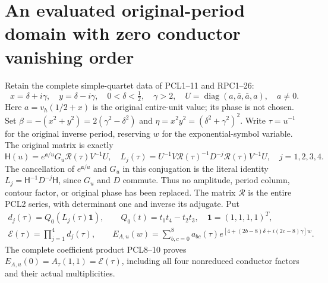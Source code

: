 \section{An evaluated original-period domain with zero conductor vanishing order}
\label{sec:period-zero-value}
Retain the complete simple-quartet data of PCL1--11 and RPC1--26:
\[
 x=\delta+i\gamma,\quad y=\delta-i\gamma,\quad
 0<\delta<\tfrac12,\quad\gamma>2,\quad
 U=\operatorname{diag}(a,\bar a,\bar a,a),\quad a\ne0.
 \tag{PZ1}
\]
Here $a=v_h(1/2+x)$ is the original entire-unit value; its phase is
not chosen. Set $\beta=-(x^2+y^2)=2(\gamma^2-\delta^2)$ and
$\eta=x^2y^2=(\delta^2+\gamma^2)^2$. Write $\tau=u^{-1}$ for the
original inverse period, reserving $w$ for the exponential-symbol variable.
The original matrix is exactly
\[
 \mathsf H(u)=e^{\mathfrak a/u}G_u\mathcal R(\tau)V^{-1}U,
 \quad L_j(\tau)=U^{-1}V\mathcal R(\tau)^{-1}D^{-j}
                         \mathcal R(\tau)V^{-1}U,
 \quad j=1,2,3,4.
 \tag{PZ2}
\]
The cancellation of $e^{\mathfrak a/u}$ and $G_u$ in this conjugation
is the literal identity $L_j=\mathsf H^{-1}D^{-j}\mathsf H$, since
$G_u$ and $D$ commute. Thus no amplitude, period column, contour factor,
or original phase has been replaced. The matrix $\mathcal R$ is the
entire PCL2 series, with determinant one and inverse its adjugate.
Put
\[
 \begin{gathered}
 d_j(\tau)=Q_0(L_j(\tau)\boldsymbol1),\qquad
 Q_0(t)=t_1t_4-t_2t_3,\quad\boldsymbol1=(1,1,1,1)^T,\\
 \mathcal E(\tau)=\prod_{j=1}^4d_j(\tau),\qquad
 E_{A,u}(w)=\sum_{b,c=0}^{8}a_{bc}(\tau)
       e^{[4+(2b-8)\delta+i(2c-8)\gamma]w}.
 \end{gathered}\tag{PZ3}
\]
The complete coefficient product PCL8--10 proves
$E_{A,u}(0)=A_\tau(1,1)=\mathcal E(\tau)$, including all four
nonreduced conductor factors and their actual multiplicities.


